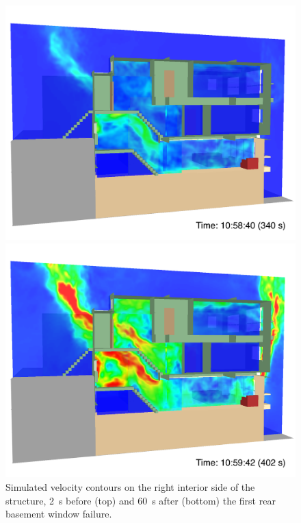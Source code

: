 \documentclass[12pt,oneside]{book}
\begin{document}
\begin{figure}[!ht]
\includegraphics[width=4.5in]{../Figures/SMV_Vel_340_s}


\includegraphics[width=4.5in]{../Figures/SMV_Vel_402_s}


\caption[Simulated velocity contours on the right interior side of the structure.]
{Simulated velocity contours on the right interior side of the structure, 2~s before (top) and 60~s after (bottom) the first rear basement window failure.}
\label{fig:smv_velocity}
\end{figure}


\clearpage
\end{document}

